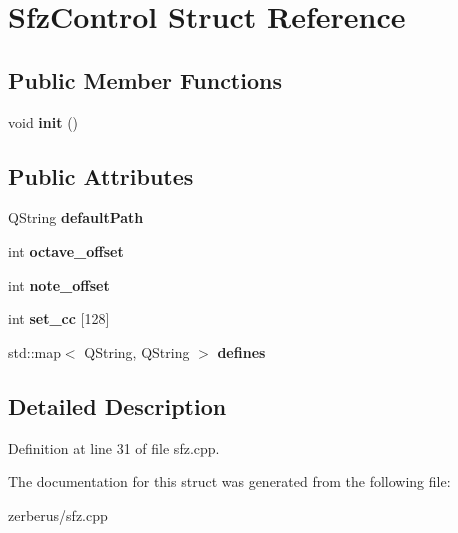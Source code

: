 \hypertarget{struct_sfz_control}{}\section{Sfz\+Control Struct Reference}
\label{struct_sfz_control}
\subsection*{Public Member Functions}
\begin{DoxyCompactItemize}
\item 
\mbox{\label{struct_sfz_control_ace617cf13f1b0a7b7ab8c9ca84a0f8b5}} 
void {\bfseries init} ()
\end{DoxyCompactItemize}
\subsection*{Public Attributes}
\begin{DoxyCompactItemize}
\item 
\mbox{\label{struct_sfz_control_a17b8929adc1354da8b0447a319833783}} 
Q\+String {\bfseries default\+Path}
\item 
\mbox{\label{struct_sfz_control_a5f506642f0f18d9425aff2eba530270e}} 
int {\bfseries octave\+\_\+offset}
\item 
\mbox{\label{struct_sfz_control_a372dfb22bef4df56fc4cbb3e7c551b4d}} 
int {\bfseries note\+\_\+offset}
\item 
\mbox{\label{struct_sfz_control_a717bf018b2b941b9bedae1bad387c83f}} 
int {\bfseries set\+\_\+cc} \mbox{[}128\mbox{]}
\item 
\mbox{\label{struct_sfz_control_a427dcefe16166250ec2cb506e000e85b}} 
std\+::map$<$ Q\+String, Q\+String $>$ {\bfseries defines}
\end{DoxyCompactItemize}


\subsection{Detailed Description}


Definition at line 31 of file sfz.\+cpp.



The documentation for this struct was generated from the following file\+:\begin{DoxyCompactItemize}
\item 
zerberus/sfz.\+cpp\end{DoxyCompactItemize}
